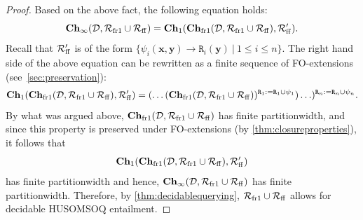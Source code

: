 \documentclass[10pt,a4paper]{amsart}
\theoremstyle{definition}
\numberwithin{equation}{section}
\theoremstyle{plain}
\theoremstyle{definition}
\theoremstyle{myexample}
\theoremstyle{plain}
\theoremstyle{definition}
\renewcommand{\vec}[1]{\boldsymbol{#1}}
\newcommand{\database}{\mathcal{D}}
\newcommand{\db}{\database}
\newcommand{\ercwidth}{\partitionwidth}
\newcommand{\hypercliquewidth}{\partitionwidth}
\newcommand{\partitionwidth}{par\-ti\-tion\-width}
\newcommand{\ruleset}{\calr}
\newcommand{\chase}{\mathbf{Ch}}
\newcommand{\calr}{\mathcal{R}}
\newcommand{\pred}[1]{\mathtt{#1}}
\newcommand{\rpred}{\pred{R}}
\begin{document}
\begin{proof}
 Based on the above fact, the following equation holds:
$$
\chase_{\infty}(\db,\ruleset_{\smash{\mathrm{fr1}}} \cup \ruleset_{\smash{\mathrm{ff}}}) = \chase_{1}(\chase_{\smash{\mathrm{fr1}}}(\db,\ruleset_{\smash{\mathrm{fr1}}} \cup \ruleset_{\smash{\mathrm{ff}}}), \ruleset_{\smash{\mathrm{ff}}}').
$$%
 Recall that $\ruleset_{\smash{\mathrm{ff}}}'$ is of the form $\{\psi_{i}(\vec{x}, \vec{y}) \rightarrow \rpred_{i}(\vec{y}) \ | \ 1 \leq i \leq n\}$. The right hand side of the above equation can be rewritten as a finite sequence of FO-extensions (see~\cref{sec:preservation}):%
$$
\chase_{1}(\chase_{\smash{\mathrm{fr1}}}(\db,\ruleset_{\smash{\mathrm{fr1}}} \cup \ruleset_{\smash{\mathrm{ff}}}), \ruleset_{\smash{\mathrm{ff}}}') = (\ldots(\chase_{\smash{\mathrm{fr1}}}(\db,\ruleset_{\smash{\mathrm{fr1}}} \cup \ruleset_{\smash{\mathrm{ff}}}))^{\rpred_{1}:= \rpred_{1} \cup \psi_{1}})\ldots)^{\rpred_{n}:= \rpred_{n} \cup \psi_{n}}.
$$%
 By what was argued above, $\chase_{\smash{\mathrm{fr1}}}(\db,\ruleset_{\smash{\mathrm{fr1}}} \cup \ruleset_{\smash{\mathrm{ff}}})$ has finite \hypercliquewidth{}, and since this property is preserved under FO-extensions (by \cref{thm:closureproperties}), it follows that  $$\chase_{1}(\chase_{\smash{\mathrm{fr1}}}(\db,\ruleset_{\smash{\mathrm{fr1}}} \cup \ruleset_{\smash{\mathrm{ff}}}), \ruleset_{\smash{\mathrm{ff}}}')$$has finite \ercwidth{} and hence, $\chase_{\infty}(\db,\ruleset_{\smash{\mathrm{fr1}}} \cup \ruleset_{\smash{\mathrm{ff}}})$ has finite \ercwidth{}. Therefore, by \cref{thm:decidablequerying}, $\ruleset_{\smash{\mathrm{fr1}}} \cup \ruleset_{\smash{\mathrm{ff}}}$ allows for decidable HUSOMSOQ entailment.
\end{proof}
\end{document}
